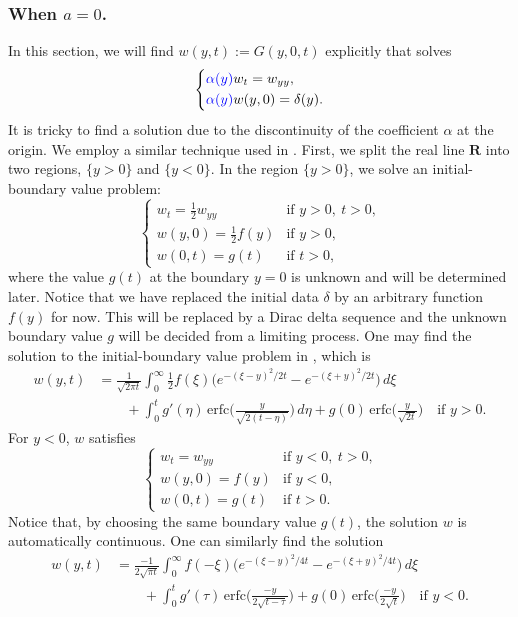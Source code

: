 \documentclass[11pt]{amsart}
\def\blue{\color{blue}}
\def\erfc{\mathrm{erfc}}
\begin{document}
\subsubsection{When $a=0$.}
In this section, we will find $w(y,t):=G(y,0,t)$ explicitly that solves
\begin{equation}\label{w0}
\left\{
\begin{aligned}
&{\blue \alpha(y)}w_t= w_{yy},\\
&{\blue \alpha(y)}w(y,0)=\delta(y).
\end{aligned}
\right.
\end{equation}
It is tricky to find a solution due to the discontinuity of the coefficient $\alpha$ at the origin. We employ a similar technique used in \cite{Chung20142520}. First, we split the real line $\textbf{R}$ into two regions, $\{ y>0 \}$ and $\{ y<0 \}$. In the region $\{y>0\}$, we solve an initial-boundary value problem:
\[
\begin{cases}
w_t = \frac{1}{2} w_{yy} & \text{if $y > 0, ~t > 0$,} \\
w(y,0) = \frac{1}{2} f(y) & \text{if $y > 0$,} \\
w(0,t) = g(t) & \text{if $t > 0$,}
\end{cases}
\]
where the value $g(t)$ at the boundary $y=0$ is unknown and will be determined later. Notice that we have replaced the initial data $\delta$ by an arbitrary function $f(y)$ for now. This will be replaced by a Dirac delta sequence and the unknown boundary value $g$ will be decided from a limiting process. One may find the solution to the initial-boundary value problem in \cite[p18 and p22]{MR1728947}, which is
\[ \begin{split}
w(y,t) &= \frac{1}{\sqrt{2 \pi t}} \int_0^\infty \frac{1}{2} f(\xi) \big( e^{-(\xi-y)^2/2t} - e^{-(\xi+y)^2/2t} \big)\,d\xi \\
& \qquad + \int_0^t g'(\eta) \,\erfc\Big( \frac{y}{\sqrt{2(t-\eta)}} \Big) \,d\eta + g(0) \,\erfc\Big( \frac{y}{\sqrt{2t}} \Big) \quad \text{if $y > 0$.}
\end{split} \]
For $y < 0$, $w$ satisfies
\[
\begin{cases}
w_t = w_{yy} & \text{if $y<0, ~t > 0$,} \\
w(y,0) = f(y) & \text{if $y < 0$,} \\
w(0,t) = g(t) & \text{if $t > 0$.}
\end{cases}
\]
Notice that, by choosing the same boundary value $g(t)$, the solution $w$ is automatically continuous. One can similarly find the solution
\[ \begin{split}
w(y,t) &= \frac{-1}{2\sqrt{\pi t}} \int_0^\infty f(-\xi) \big( e^{-(\xi-y)^2/4t} - e^{-(\xi+y)^2/4t} \big) \,d\xi \\
& \qquad + \int_0^t g'(\tau) \,\erfc\Big( \frac{-y}{2\sqrt{t-\tau}} \Big) + g(0) \,\erfc\Big( \frac{-y}{2\sqrt{t}} \Big) \quad \text{if $y < 0$.}
\end{split} \]
\end{document}
